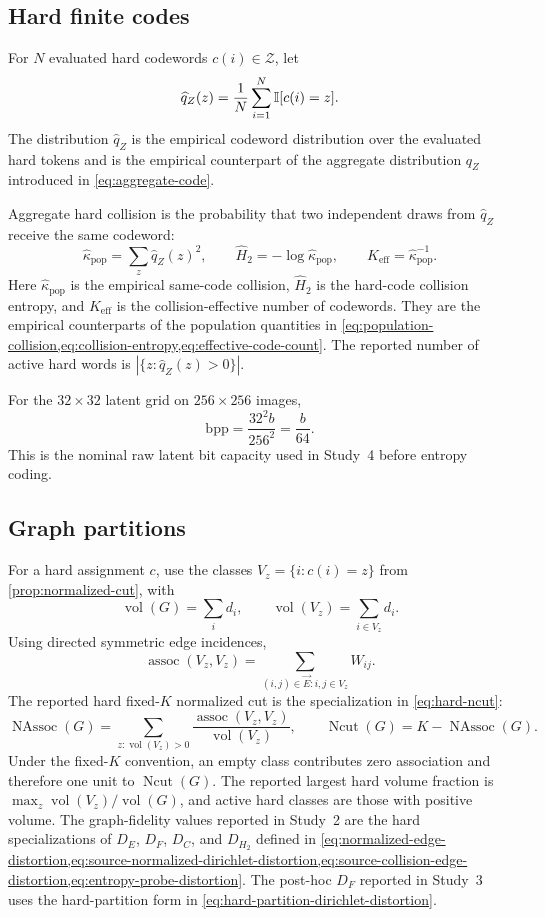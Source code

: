 \subsection{Hard finite codes}

For $N$ evaluated hard codewords $c(i)\in\mathcal Z$, let
\begin{equation}
\widehat q_Z(z)
=\frac1N\sum_{i=1}^N\mathbb{I}[c(i)=z].
\end{equation}
The distribution $\widehat q_Z$ is the empirical codeword distribution over the evaluated hard tokens and is the empirical counterpart of the aggregate distribution $q_Z$ introduced in \cref{eq:aggregate-code}.

Aggregate hard collision is the probability that two independent draws from $\widehat q_Z$ receive the same codeword:
\begin{equation}
\widehat\kappa_{\mathrm{pop}}
=\sum_z\widehat q_Z(z)^2,\qquad
\widehat H_2
=-\log\widehat\kappa_{\mathrm{pop}},\qquad
K_{\mathrm{eff}}
=\widehat\kappa_{\mathrm{pop}}^{-1}.
\end{equation}
Here $\widehat\kappa_{\mathrm{pop}}$ is the empirical same-code collision, $\widehat H_2$ is the hard-code collision entropy, and $K_{\mathrm{eff}}$ is the collision-effective number of codewords.
They are the empirical counterparts of the population quantities in \cref{eq:population-collision,eq:collision-entropy,eq:effective-code-count}.
The reported number of active hard words is $|\{z:\widehat q_Z(z)>0\}|$.

For the $32\times32$ latent grid on $256\times256$ images,
\[
\mathrm{bpp}
=\frac{32^2b}{256^2}
=\frac{b}{64}.
\]
This is the nominal raw latent bit capacity used in Study~4 before entropy coding.

\subsection{Graph partitions}

For a hard assignment $c$, use the classes $V_z=\{i:c(i)=z\}$ from \cref{prop:normalized-cut}, with
\[
\operatorname{vol}(G)=\sum_i d_i,\qquad
\operatorname{vol}(V_z)=\sum_{i\in V_z}d_i.
\]
Using directed symmetric edge incidences,
\[
\operatorname{assoc}(V_z,V_z)
=\sum_{(i,j)\in\vec E:i,j\in V_z}W_{ij}.
\]
The reported hard fixed-$K$ normalized cut is the specialization in \cref{eq:hard-ncut}:
\[
\operatorname{NAssoc}(G)
=\sum_{z:\operatorname{vol}(V_z)>0}
\frac{\operatorname{assoc}(V_z,V_z)}{\operatorname{vol}(V_z)},\qquad
\operatorname{Ncut}(G)
=K-\operatorname{NAssoc}(G).
\]
Under the fixed-$K$ convention, an empty class contributes zero association and therefore one unit to $\operatorname{Ncut}(G)$.
The reported largest hard volume fraction is $\max_z\operatorname{vol}(V_z)/\operatorname{vol}(G)$, and active hard classes are those with positive volume.
The graph-fidelity values reported in Study~2 are the hard specializations of $D_E$, $D_F$, $D_C$, and $D_{H_2}$ defined in \cref{eq:normalized-edge-distortion,eq:source-normalized-dirichlet-distortion,eq:source-collision-edge-distortion,eq:entropy-probe-distortion}.
The post-hoc $D_F$ reported in Study~3 uses the hard-partition form in \cref{eq:hard-partition-dirichlet-distortion}.


